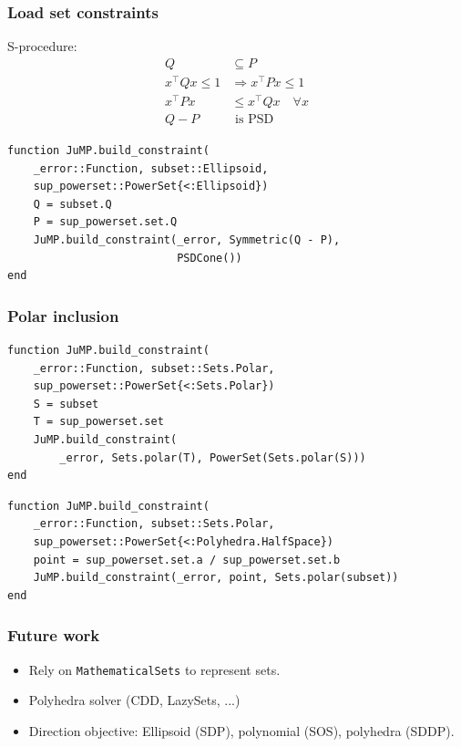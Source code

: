 \documentclass{beamer}
\begin{document}
\begin{frame}[fragile]
  \frametitle{Load set constraints}
  S-procedure:
  \begin{align*}
    Q & \subseteq P\\
    x^\top Qx \le 1 & \Rightarrow x^\top Px \le 1\\
    x^\top Px & \le x^\top Qx \quad \forall x\\
    Q - P & \text{ is PSD}
  \end{align*}
  \begin{verbatim}
function JuMP.build_constraint(
    _error::Function, subset::Ellipsoid,
    sup_powerset::PowerSet{<:Ellipsoid})
    Q = subset.Q
    P = sup_powerset.set.Q
    JuMP.build_constraint(_error, Symmetric(Q - P),
                          PSDCone())
end
  \end{verbatim}
\end{frame}

\begin{frame}[fragile]
  \frametitle{Polar inclusion}
  \begin{verbatim}
function JuMP.build_constraint(
    _error::Function, subset::Sets.Polar,
    sup_powerset::PowerSet{<:Sets.Polar})
    S = subset
    T = sup_powerset.set
    JuMP.build_constraint(
        _error, Sets.polar(T), PowerSet(Sets.polar(S)))
end
  \end{verbatim}
  \begin{verbatim}
function JuMP.build_constraint(
    _error::Function, subset::Sets.Polar,
    sup_powerset::PowerSet{<:Polyhedra.HalfSpace})
    point = sup_powerset.set.a / sup_powerset.set.b
    JuMP.build_constraint(_error, point, Sets.polar(subset))
end
  \end{verbatim}
\end{frame}

\begin{frame}[fragile]
  \frametitle{Future work}
  \begin{itemize}
    \item Rely on \verb|MathematicalSets| to represent sets.
    \item Polyhedra solver (CDD, LazySets, ...)
    \item Direction objective: Ellipsoid (SDP), polynomial (SOS), polyhedra (SDDP).
  \end{itemize}
\end{frame}
\end{document}
